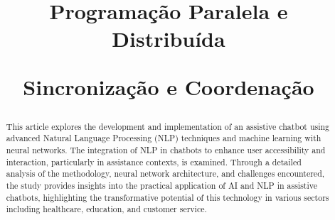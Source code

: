 \documentclass[conference]{IEEEtran}
\begin{document}
\title{Programação Paralela e Distribuída

Sincronização e Coordenação\\
}

\author{
    \and

    \and

    \and

    
    \and 

}

\maketitle

\begin{abstract}
This article explores the development and implementation of an assistive chatbot using advanced Natural Language Processing (NLP) techniques 
and machine learning with neural networks. 
The integration of NLP in chatbots to enhance user accessibility and interaction, particularly in assistance contexts, is examined. 
Through a detailed analysis of the methodology, neural network architecture, and challenges encountered, 
the study provides insights into the practical application of AI and NLP in assistive chatbots, 
highlighting the transformative potential of this technology in various sectors including healthcare, education, and customer service.
\end{abstract}
\end{document}
